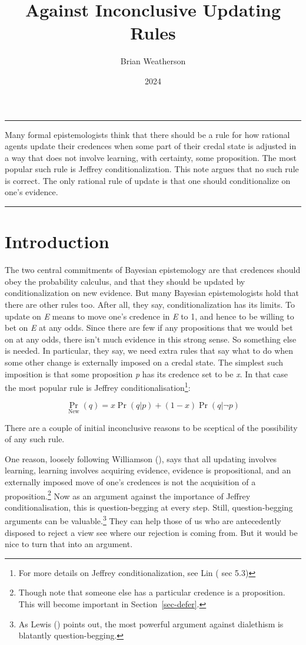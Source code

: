 \documentclass[
  10pt,
  letterpaper,
  DIV=11,
  numbers=noendperiod,
  twoside]{scrartcl}
\title{Against Inconclusive Updating Rules}
\author{Brian Weatherson}
\date{2024}
\renewenvironment{abstract}
 {\vspace{-1.25cm}
 \quotation\small\noindent\rule{\linewidth}{.5pt}\par\smallskip
 \noindent }
 {\par\noindent\rule{\linewidth}{.5pt}\endquotation}
\begin{document}
\maketitle
\begin{abstract}
Many formal epistemologists think that there should be a rule for how
rational agents update their credences when some part of their credal
state is adjusted in a way that does not involve learning, with
certainty, some proposition. The most popular such rule is Jeffrey
conditionalization. This note argues that no such rule is correct. The
only rational rule of update is that one should conditionalize on one's
evidence.
\end{abstract}

\section{Introduction}\label{sec-intro}

The two central commitments of Bayesian epistemology are that credences
should obey the probability calculus, and that they should be updated by
conditionalization on new evidence. But many Bayesian epistemologists
hold that there are other rules too. After all, they say,
conditionalization has its limits. To update on \emph{E} means to move
one's credence in \emph{E} to 1, and hence to be willing to bet on
\emph{E} at any odds. Since there are few if any propositions that we
would bet on at any odds, there isn't much evidence in this strong
sense. So something else is needed. In particular, they say, we need
extra rules that say what to do when some other change is externally
imposed on a credal state. The simplest such imposition is that some
proposition \emph{p} has its credence set to be \emph{x}. In that case
the most popular rule is Jeffrey conditionalisation\footnote{For more
  details on Jeffrey conditionalization, see Lin
  ( sec 5.3)}:

\[
\Pr_{\text{New}}(q) = x\Pr(q | p) + (1-x)\Pr(q | \neg p)
\]

There are a couple of initial inconclusive reasons to be sceptical of
the possibility of any such rule.

One reason, loosely following Williamson
(), says that all updating involves
learning, learning involves acquiring evidence, evidence is
propositional, and an externally imposed move of one's credences is not
the acquisition of a proposition.\footnote{Though note that someone else
  has a particular credence is a proposition. This will become important
  in Section~\ref{sec-defer}.} Now as an argument against the importance
of Jeffrey conditionalisation, this is question-begging at every step.
Still, question-begging arguments can be valuable.\footnote{As Lewis
  () points out, the most powerful
  argument against dialethism is blatantly question-begging.} They can
help those of us who are antecedently disposed to reject a view see
where our rejection is coming from. But it would be nice to turn that
into an argument.
\end{document}

